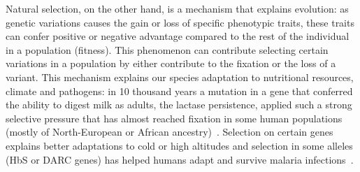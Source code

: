Natural selection, on the other hand, is a mechanism that explains evolution: as genetic variations causes the gain or loss of specific phenotypic traits, these traits can confer positive or negative advantage compared to the rest of the individual in a population (fitness). This phenomenon can contribute selecting certain variations in a population by either contribute to the fixation or the loss of a variant. This mechanism explains our species adaptation to nutritional resources, climate and pathogens: in 10 thousand years a mutation in a gene that conferred the ability to digest milk as adults, the lactase persistence, applied such a strong selective pressure that has almost reached fixation in some human populations (mostly of North-European or African ancestry)~\cite{lactase}. Selection on certain genes explains better adaptations to cold or high altitudes and selection in some alleles (HbS or DARC genes) has helped humans adapt and survive malaria infections~\cite{genome_diversity_quintana}. 


